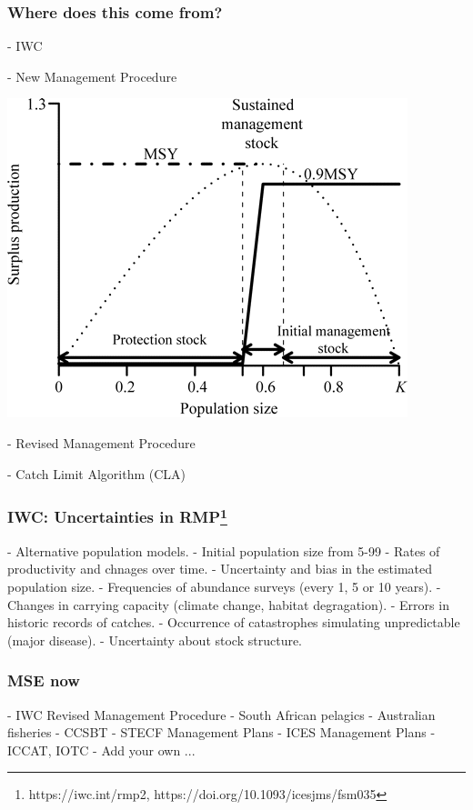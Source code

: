 \documentclass{beamer}\usepackage[]{graphicx}\usepackage[]{xcolor}
\begin{document}
\begin{frame}
\frametitle{Where does this come from?}

- IWC

- New Management Procedure

\begin{center}
\includegraphics[height=0.4\textheight]{figs/nmp}
\end{center}

- Revised Management Procedure

- Catch Limit Algorithm (CLA)

\end{frame}

\begin{frame}
\frametitle{IWC: Uncertainties in RMP\footnote{https://iwc.int/rmp2, https://doi.org/10.1093/icesjms/fsm035}}

- Alternative population models.
- Initial population size from 5-99%
- Rates of productivity and chnages over time.
- Uncertainty and bias in the estimated population size.
- Frequencies of abundance surveys (every 1, 5 or 10 years).
- Changes in carrying capacity (climate change, habitat degragation).
- Errors in historic records of catches.
- Occurrence of catastrophes simulating unpredictable (major disease).
- Uncertainty about stock structure.

\end{frame}

\begin{frame}
\frametitle{MSE now}

- IWC Revised Management Procedure
- South African pelagics
- Australian fisheries
- CCSBT
- STECF Management Plans
- ICES Management Plans
- ICCAT, IOTC
- Add your own ...

\end{frame}
\end{document}
